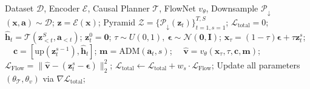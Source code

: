 \begin{algorithm}[t]
\caption{SAMPO++ Training (End-to-End)}
\label{algo:training}
\begin{algorithmic}[1]
\REQUIRE Dataset $\mathcal{D}$, Encoder $\mathcal{E}$, Causal Planner $\mathcal{T}$, FlowNet $v_\theta$, Downsample $\mathcal{P}_{\downarrow}$
\STATE $(\boldsymbol{x}, \boldsymbol{a}) \sim \mathcal{D}$; $\boldsymbol{z} = \mathcal{E}(\boldsymbol{x})$; Pyramid $\mathcal{Z} = \{\mathcal{P}_{\downarrow}(\boldsymbol{z}_t)\}_{t=1, s=1}^{T, S}$;
\STATE $\mathcal{L}_{\text{total}} = 0$;
    \STATE $\hat{\boldsymbol{h}}_t = \mathcal{T}(\boldsymbol{z}_{<t}^S, \boldsymbol{a}_{<t})$; 
    \STATE $\boldsymbol{z}_t^0 = \boldsymbol{0}$; 
        \STATE $\tau \sim U(0,1), \ \boldsymbol{\epsilon} \sim \mathcal{N}(\boldsymbol{0}, \boldsymbol{I})$;
        \STATE $\boldsymbol{x}_\tau = (1-\tau)\boldsymbol{\epsilon} + \tau \boldsymbol{z}_t^s$; \ \ $\boldsymbol{c} = [ \text{up}(\boldsymbol{z}_t^{s-1}) , \hat{\boldsymbol{h}}_t ]$;
        \STATE $\boldsymbol{m} = \text{ADM}(\boldsymbol{a}_t, s)$; \ \ $\hat{\boldsymbol{v}} = v_\theta(\boldsymbol{x}_\tau, \tau, \boldsymbol{c}, \boldsymbol{m})$;
        \STATE $\mathcal{L}_{\text{Flow}} = \|\hat{\boldsymbol{v}} - (\boldsymbol{z}_t^s - \boldsymbol{\epsilon})\|_2^2$;
        \STATE $\mathcal{L}_{\text{total}} \leftarrow \mathcal{L}_{\text{total}} + w_s \cdot \mathcal{L}_{\text{Flow}}$;
    \ENDFOR
\ENDFOR
\STATE Update all parameters $(\theta_{\mathcal{T}}, \theta_{v})$ via $\nabla \mathcal{L}_{\text{total}}$;
\end{algorithmic}
\end{algorithm}
